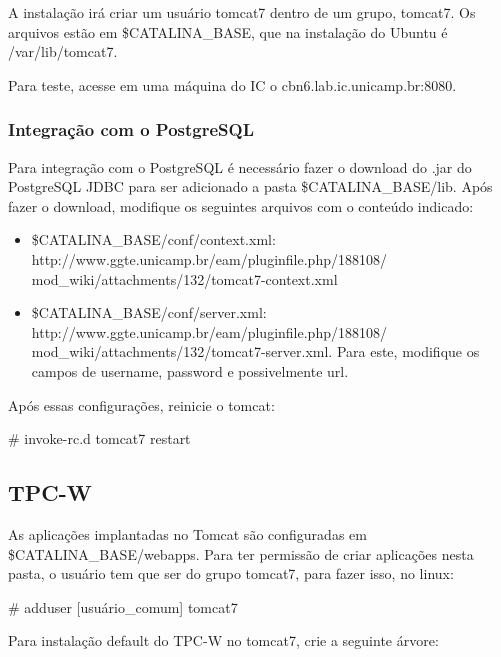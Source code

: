 \documentclass[a4paper,10pt]{article}
\begin{document}
        A instalação irá criar um usuário tomcat7 dentro de um grupo, tomcat7. Os arquivos estão em \$CATALINA\_BASE, que na instalação do Ubuntu é /var/lib/tomcat7.

        Para teste, acesse em uma máquina do IC o cbn6.lab.ic.unicamp.br:8080.
        
        \subsubsection{Integração com o PostgreSQL}
        Para integração com o PostgreSQL é necessário fazer o download do .jar do PostgreSQL JDBC para ser adicionado a pasta \$CATALINA\_BASE/lib. Após fazer o download, modifique os seguintes arquivos com o conteúdo indicado:

        \begin{itemize}
        \setlength{\itemindent}{-.0in}
            \item \$CATALINA\_BASE/conf/context.xml: http://www.ggte.unicamp.br/eam/pluginfile.php/188108/
            mod\_wiki/attachments/132/tomcat7-context.xml
            \item \$CATALINA\_BASE/conf/server.xml: http://www.ggte.unicamp.br/eam/pluginfile.php/188108/
            mod\_wiki/attachments/132/tomcat7-server.xml. Para este, modifique os campos de username, password e possivelmente url.
        \end{itemize}
        
        Após essas configurações, reinicie o tomcat:
        
        \begin{spverbatim}
        # invoke-rc.d tomcat7 restart
        \end{spverbatim}
         
        \subsection{TPC-W}
        
        As aplicações implantadas no Tomcat são configuradas em \$CATALINA\_BASE/webapps. Para ter permissão de criar aplicações nesta pasta, o usuário tem que ser do grupo tomcat7, para fazer isso, no linux:
        
        \begin{spverbatim}
            # adduser [usuário_comum] tomcat7
        \end{spverbatim}
        
        Para instalação default do TPC-W no tomcat7, crie a seguinte árvore:
        
\end{document}
